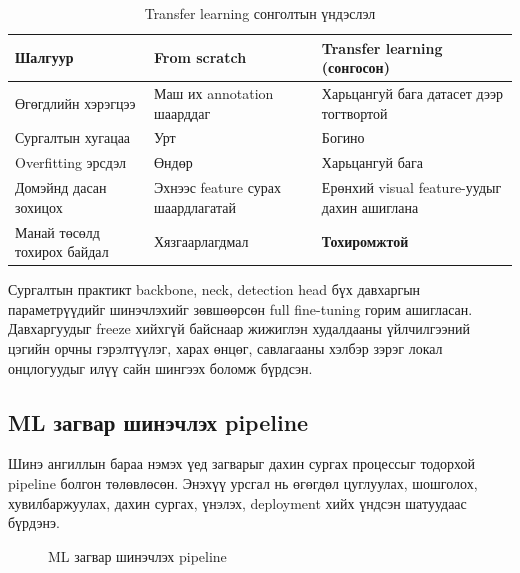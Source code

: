 \begin{longtable}{|p{3.4cm}|p{3.6cm}|p{5.2cm}|}
\caption{Transfer learning сонголтын үндэслэл}
\label{tab:transfer_learning_rationale} \\
\hline
\textbf{Шалгуур} & \textbf{From scratch} & \textbf{Transfer learning (сонгосон)} \\
\hline
Өгөгдлийн хэрэгцээ & Маш их annotation шаарддаг & Харьцангуй бага датасет дээр тогтвортой \\
\hline
Сургалтын хугацаа & Урт & Богино \\
\hline
Overfitting эрсдэл & Өндөр & Харьцангуй бага \\
\hline
Домэйнд дасан зохицох & Эхнээс feature сурах шаардлагатай & Ерөнхий visual feature-уудыг дахин ашиглана \\
\hline
Манай төсөлд тохирох байдал & Хязгаарлагдмал & \textbf{Тохиромжтой} \\
\hline
\end{longtable}

Сургалтын практикт backbone, neck, detection head бүх давхаргын параметрүүдийг шинэчлэхийг зөвшөөрсөн full fine-tuning горим ашигласан. Давхаргуудыг freeze хийхгүй байснаар жижиглэн худалдааны үйлчилгээний цэгийн орчны гэрэлтүүлэг, харах өнцөг, савлагааны хэлбэр зэрэг локал онцлогуудыг илүү сайн шингээх боломж бүрдсэн.

\subsection{ML загвар шинэчлэх pipeline}

Шинэ ангиллын бараа нэмэх үед загварыг дахин сургах процессыг тодорхой pipeline болгон төлөвлөсөн. Энэхүү урсгал нь өгөгдөл цуглуулах, шошголох, хувилбаржуулах, дахин сургах, үнэлэх, deployment хийх үндсэн шатуудаас бүрдэнэ.

\begin{figure}[H]
\centering
{}
\caption{ML загвар шинэчлэх pipeline}
\label{fig:model_update_pipeline}
\end{figure}

